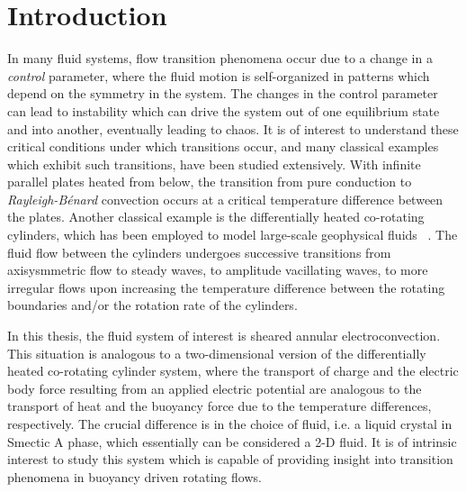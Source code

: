 \chapter{Introduction}
\thispagestyle{empty}
In many fluid systems, flow transition phenomena occur due to a change in a \emph{control} parameter, where the fluid motion is self-organized in patterns which depend on the symmetry in the system. The changes in the control parameter can lead to instability which can drive the system out of one equilibrium state and into another, eventually leading to chaos. It is of interest to understand these critical conditions under which transitions occur, and many classical examples which exhibit such transitions, have been studied extensively.
With infinite parallel plates heated from below, the transition from pure conduction to  \emph{Rayleigh-B\'enard} convection occurs at a critical temperature difference between the plates.
Another classical example is the differentially heated co-rotating cylinders, which has been employed to model {large-scale} geophysical fluids ~\cite{Lew_Henn,Lew_DoubleHopf}. The fluid flow between the cylinders undergoes successive transitions from axisysmmetric flow to steady waves, to amplitude vacillating waves, to more irregular flows  upon increasing the temperature difference between the rotating boundaries and/or the rotation rate of the cylinders.

In this thesis, the fluid system of interest is sheared annular electroconvection. This situation is analogous to a {two-dimensional} version of the  differentially heated co-rotating cylinder system, where the transport of charge and the electric body force resulting from an applied electric potential are analogous to the transport of heat and the buoyancy force due to the temperature differences, respectively. The crucial difference is in the choice of fluid, i.e. a liquid crystal in {Smectic A} phase, which essentially can be considered a {2-D} fluid. It is of intrinsic interest to study this system which is capable of providing insight into transition phenomena in buoyancy driven rotating flows.

